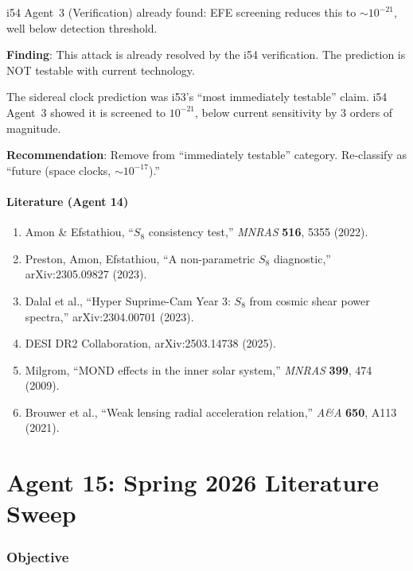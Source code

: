 \documentclass[11pt,a4paper]{article}
\begin{document}
i54 Agent~3 (Verification) already found: EFE screening reduces this to $\sim 10^{-21}$, well below detection threshold.

\textbf{Finding}: This attack is already resolved by the i54 verification. The prediction is NOT testable with current technology.

\begin{tcolorbox}[colback=red!5!white, colframe=red!60!black, title={Agent 14: Clock Signal --- FALSIFIED AS TESTABLE}]
The sidereal clock prediction was i53's ``most immediately testable'' claim. i54 Agent~3 showed it is screened to $10^{-21}$, below current sensitivity by 3 orders of magnitude.

\textbf{Recommendation}: Remove from ``immediately testable'' category. Re-classify as ``future (space clocks, $\sim 10^{-17}$).''
\end{tcolorbox}

\subsection{Literature (Agent 14)}

\begin{enumerate}
\item Amon \& Efstathiou, ``$S_8$ consistency test,'' \textit{MNRAS} \textbf{516}, 5355 (2022).
\item Preston, Amon, Efstathiou, ``A non-parametric $S_8$ diagnostic,'' arXiv:2305.09827 (2023).
\item Dalal et al., ``Hyper Suprime-Cam Year 3: $S_8$ from cosmic shear power spectra,'' arXiv:2304.00701 (2023).
\item DESI DR2 Collaboration, arXiv:2503.14738 (2025).
\item Milgrom, ``MOND effects in the inner solar system,'' \textit{MNRAS} \textbf{399}, 474 (2009).
\item Brouwer et al., ``Weak lensing radial acceleration relation,'' \textit{A\&A} \textbf{650}, A113 (2021).
\end{enumerate}


\part{Agent 15: Spring 2026 Literature Sweep}
\label{part:literature-spring}

\section{Objective}
\end{document}
